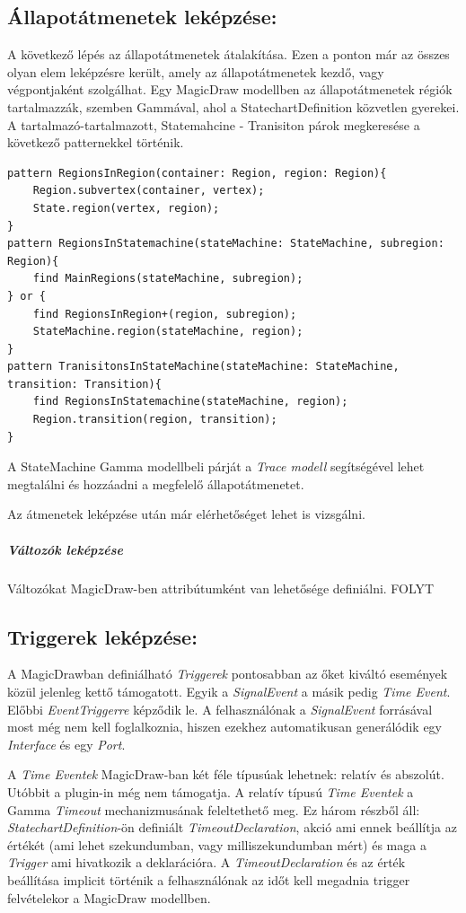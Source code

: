\subsection{Állapotátmenetek leképzése:} A következő lépés az állapotátmenetek átalakítása. Ezen a ponton már az összes olyan elem leképzésre került, amely az állapotátmenetek kezdő, vagy végpontjaként szolgálhat. Egy MagicDraw modellben az állapotátmenetek régiók tartalmazzák, szemben Gammával, ahol a StatechartDefinition közvetlen gyerekei. A tartalmazó-tartalmazott, Statemahcine - Tranisiton párok megkeresése a következő patternekkel történik.
\lstset{style=VQL}
\begin{lstlisting}
pattern RegionsInRegion(container: Region, region: Region){
	Region.subvertex(container, vertex);
	State.region(vertex, region);
}
pattern RegionsInStatemachine(stateMachine: StateMachine, subregion: Region){
	find MainRegions(stateMachine, subregion);
} or {
	find RegionsInRegion+(region, subregion);
	StateMachine.region(stateMachine, region);
}
pattern TranisitonsInStateMachine(stateMachine: StateMachine, transition: Transition){
	find RegionsInStatemachine(stateMachine, region);
	Region.transition(region, transition);
}
\end{lstlisting}

A StateMachine Gamma modellbeli párját a \emph{Trace modell} segítségével lehet megtalálni és hozzáadni a megfelelő állapotátmenetet.

Az átmenetek leképzése után már elérhetőséget lehet is vizsgálni.

\subparagraph{Változók leképzése}
Változókat MagicDraw-ben attribútumként van lehetősége definiálni. FOLYT


\subsection{Triggerek leképzése:} A MagicDrawban definiálható \emph{Triggerek} pontosabban az őket kiváltó események közül jelenleg kettő támogatott. Egyik a \emph{SignalEvent} a másik pedig \emph{Time Event}. Előbbi \emph{EventTriggerre} képződik le. A felhasználónak a \emph{SignalEvent} forrásával most még nem kell foglalkoznia, hiszen ezekhez automatikusan generálódik egy \emph{Interface} és egy \emph{Port}.

A \emph{Time Eventek} MagicDraw-ban két féle típusúak lehetnek: relatív és abszolút. Utóbbit a plugin-in még nem támogatja.
A relatív típusú \emph{Time Eventek} a Gamma \emph{Timeout} mechanizmusának feleltethető meg. Ez három részből áll: \emph{StatechartDefinition}-ön definiált \emph{TimeoutDeclaration}, akció ami ennek beállítja az értékét (ami lehet szekundumban, vagy milliszekundumban mért) és maga a \emph{Trigger} ami hivatkozik a deklarációra. A \emph{TimeoutDeclaration} és az érték beállítása implicit történik a felhasználónak az időt kell megadnia trigger felvételekor a MagicDraw modellben.

